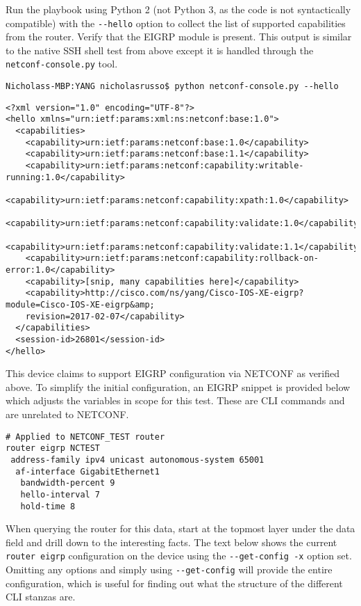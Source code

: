 Run the playbook using Python 2 (not Python 3, as the code is not
syntactically compatible) with the \verb|--hello| option to collect the list of
supported capabilities from the router. Verify that the EIGRP module is
present. This output is similar to the native SSH shell test from above except
it is handled through the \verb|netconf-console.py| tool.

\begin{verbatim}
Nicholass-MBP:YANG nicholasrusso$ python netconf-console.py --hello
\end{verbatim}

\begin{verbatim}
<?xml version="1.0" encoding="UTF-8"?>
<hello xmlns="urn:ietf:params:xml:ns:netconf:base:1.0">
  <capabilities>
    <capability>urn:ietf:params:netconf:base:1.0</capability>
    <capability>urn:ietf:params:netconf:base:1.1</capability>
    <capability>urn:ietf:params:netconf:capability:writable-running:1.0</capability>
    <capability>urn:ietf:params:netconf:capability:xpath:1.0</capability>
    <capability>urn:ietf:params:netconf:capability:validate:1.0</capability>
    <capability>urn:ietf:params:netconf:capability:validate:1.1</capability>
    <capability>urn:ietf:params:netconf:capability:rollback-on-error:1.0</capability>
    <capability>[snip, many capabilities here]</capability>
    <capability>http://cisco.com/ns/yang/Cisco-IOS-XE-eigrp?module=Cisco-IOS-XE-eigrp&amp;
	revision=2017-02-07</capability>
  </capabilities>
  <session-id>26801</session-id>
</hello>
\end{verbatim}

This device claims to support EIGRP configuration via NETCONF as verified
above. To simplify the initial configuration, an EIGRP snippet is provided
below which adjusts the variables in scope for this test. These are CLI
commands and are unrelated to NETCONF\@.

\begin{verbatim}
# Applied to NETCONF_TEST router
router eigrp NCTEST
 address-family ipv4 unicast autonomous-system 65001
  af-interface GigabitEthernet1
   bandwidth-percent 9
   hello-interval 7
   hold-time 8
\end{verbatim}

When querying the router for this data, start at the topmost layer under the
data field and drill down to the interesting facts. The text below shows the
current \verb|router eigrp| configuration on the device using the
\verb|--get-config -x| option set. Omitting any options and simply using
\verb|--get-config| will provide the entire configuration, which is useful for
finding out what the structure of the different CLI stanzas are.

